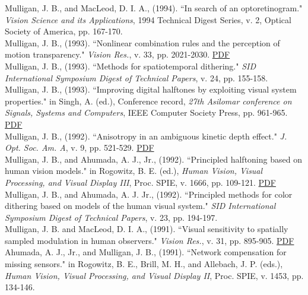 \documentclass[12pt]{article}
\newcommand{\years}[1]{\marginnote{\scriptsize #1}}
\begin{document}
\years{1994}
Mulligan, J. B., and MacLeod, D. I. A., (1994).
``In search of an optoretinogram."
\emph{Vision Science and its Applications},
1994 Technical Digest Series,
v. 2,
Optical Society of America,
pp. 167-170.\\

\years{1993}
Mulligan, J. B., (1993).
``Nonlinear combination rules and the perception of motion transparency."
\emph{Vision Res.},
v. 33, pp. 2021-2030.  \href{http://scanpath.arc.nasa.gov/pub_files/vr93.pdf}{PDF}\\

Mulligan, J. B., (1993).
``Methods for spatiotemporal dithering."
\emph{SID International Symposium Digest of Technical Papers},
v. 24, pp. 155-158.\\

Mulligan, J. B., (1993).
``Improving digital halftones by exploiting visual system properties."
in Singh, A. (ed.), Conference record,
\emph{27th Asilomar conference on Signals, Systems and Computers},
IEEE Computer Society Press,
pp. 961-965.  \href{http://scanpath.arc.nasa.gov/pub_files/asil93.pdf}{PDF}\\

\years{1992}
Mulligan, J. B., (1992).
``Anisotropy in an ambiguous kinetic depth effect."
\emph{J. Opt. Soc. Am. A},
v. 9, pp. 521-529.  \href{http://scanpath.arc.nasa.gov/pub_files/josa92.pdf}{PDF}\\

Mulligan, J. B., and Ahumada, A. J., Jr., (1992).
``Principled halftoning based on human vision models."
in Rogowitz, B. E. (ed.),
\emph{Human Vision, Visual Processing, and Visual Display III},
Proc. SPIE, v. 1666,
pp. 109-121.  \href{http://scanpath.arc.nasa.gov/pub_files/spie92.pdf}{PDF}\\

Mulligan, J. B., and Ahumada, A. J. Jr., (1992).
``Principled methods for color dithering based on models of the human visual system."
\emph{SID International Symposium Digest of Technical Papers},
v. 23, pp. 194-197.\\

\years{1991}
Mulligan, J. B. and MacLeod, D. I. A., (1991).
``Visual sensitivity to spatially sampled modulation in human observers."
\emph{Vision Res.}, v. 31, pp. 895-905.  \href{http://scanpath.arc.nasa.gov/pub_files/vr91.pdf}{PDF}\\

Ahumada, A. J., Jr., and Mulligan, J. B., (1991).
``Network compensation for missing sensors."
in Rogowitz, B. E., Brill, M. H., and Allebach, J. P. (eds.),
\emph{Human Vision, Visual Processing, and Visual Display II},
Proc. SPIE, v. 1453,
pp. 134-146.\\
\end{document}
